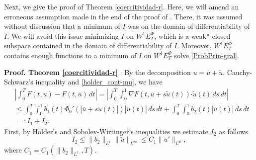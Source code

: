 \documentclass[twoside]{elsarticle}
\theoremstyle{remark}
\newcommand{\orlnor}{\|_{L^{\Phi}}}
\newcommand{\ephi}{E^{\Phi}}
\newcommand{\wphiet}{W^{1}\ephi_T}
\renewcommand{\b}[1]{\boldsymbol{#1}}
\newcommand{\ccdot}{\b{\cdot}}
\renewcommand{\leq}{\leqslant}
\begin{document}
Next, we give the proof of Theorem \ref{coercitividad-r}.  Here,  we will amend an
erroneous assumption made in the end of the proof of  \cite[Thm. 6.2]{ABGMS2015}.
There, it was assumed without discussion that  a minimum of  $I$ was on the domain of differentiability of $I$.
We will avoid  this issue  minimizing $I$ on $\wphiet$, which is a weak* closed subspace  contained in the  domain of differentiability of $I$. Moreover, $\wphiet$ contains enough functions to a minimum of $I$ on $\wphiet$ solve \eqref{ProbPrin-gral}.
\vspace{.4cm}

\noindent\textbf{Proof. Theorem \ref{coercitividad-r} }. By the decomposition $u=\overline{u}+\tilde{u}$,   Cauchy-Schwarz's inequality
and \eqref{holder_cont-mu}, we have
\begin{equation}\label{cota-diferencia-F}
\begin{split}
&\left|\int_0^T F(t,u)-F(t,\overline{u})\,dt\right|=
\left|\int_0^T \int_0^1 \nabla F(t,\overline{u}+s\tilde{u}(t))\ccdot \tilde{u}(t) \,ds \,dt\right|
\\
&\leq \int_0^T \int_0^1 b_1(t)\Phi_0'(|\overline{u}+s\tilde{u}(t)|)|\tilde{u}(t)|\,ds\,dt+
\int_0^T \int_0^1 b_2(t)|\tilde{u}(t)|\,ds\,dt
\\
&=:I_1+I_2.
\end{split}
\end{equation}
First, by H\"older's and Sobolev-Wirtinger's inequalities we estimate $I_2$ as follows
\begin{equation}\label{cota-i2}
I_2\leq \|b_2\|_{L^1} \|\tilde{u}\|_{L^{\infty}}\leq
C_1\|u'\orlnor,
\end{equation}
 where $C_1=C_1(\|b_2\|_{L^1}, T)$.
\end{document}
